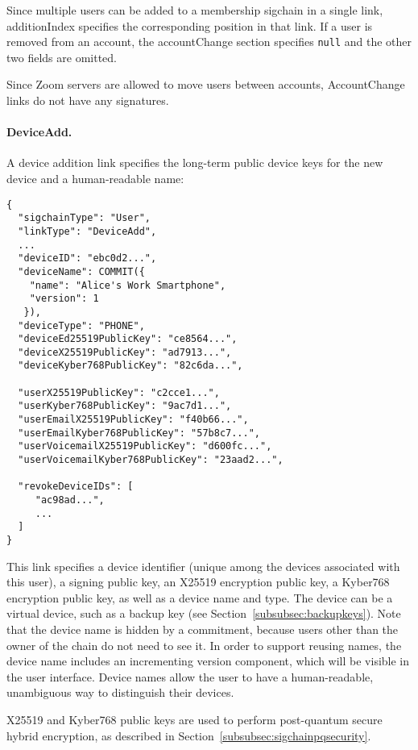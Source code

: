 Since multiple users can be added to a membership sigchain in a single link, \textsf{additionIndex}
specifies the corresponding position in that link. If a user is removed from an account, the
\textsf{accountChange} section specifies \accountID \texttt{null} and the other two fields are
omitted.

Since Zoom servers are allowed to move users between accounts, \textsf{AccountChange} links do not
have any signatures.

\paragraph{DeviceAdd.} A device addition link specifies the long-term public device keys for the new
device and a human-readable name:

\begin{Verbatim}
{
  "sigchainType": "User",
  "linkType": "DeviceAdd",
  ...
  "deviceID": "ebc0d2...",
  "deviceName": COMMIT({
    "name": "Alice's Work Smartphone",
    "version": 1
   }),
  "deviceType": "PHONE",
  "deviceEd25519PublicKey": "ce8564...",
  "deviceX25519PublicKey": "ad7913...",
  "deviceKyber768PublicKey": "82c6da...",

  "userX25519PublicKey": "c2cce1...",
  "userKyber768PublicKey": "9ac7d1...",
  "userEmailX25519PublicKey": "f40b66...",
  "userEmailKyber768PublicKey": "57b8c7...",
  "userVoicemailX25519PublicKey": "d600fc...",
  "userVoicemailKyber768PublicKey": "23aad2...",

  "revokeDeviceIDs": [
     "ac98ad...",
     ...
  ]
}
\end{Verbatim}

This link specifies a device identifier (unique among the devices associated with this user), a
signing public key, an X25519 encryption public key, a Kyber768 encryption public key, as well as a
device name and type. The device can be a virtual device, such as a backup key (see
Section~\ref{subsubsec:backupkeys}).  Note that the device name is hidden by a commitment, because
users other than the owner of the chain do not need to see it. In order to support reusing names,
the device name includes an incrementing version component, which will be visible in the user
interface. Device names allow the user to have a human-readable, unambiguous way to distinguish
their devices.

X25519 and Kyber768 public keys are used to perform post-quantum secure hybrid encryption, as
described in Section~\ref{subsubsec:sigchainpqsecurity}.

